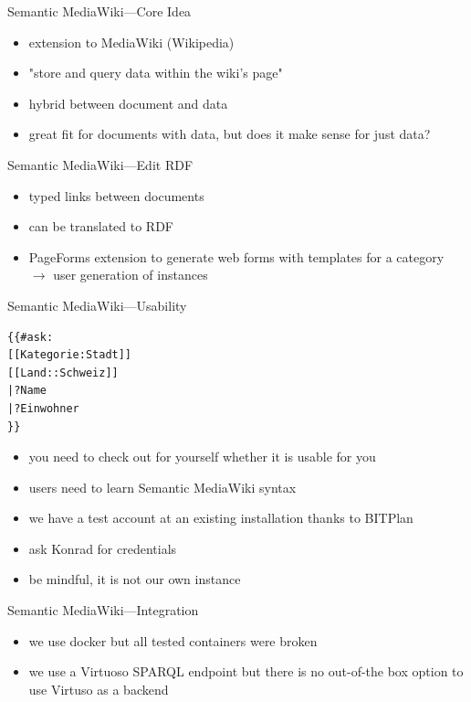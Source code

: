 \documentclass[aspectratio=1610]{beamer}
\begin{document}
\begin{frame}{Semantic MediaWiki---Core Idea}
\begin{itemize}
\item extension to MediaWiki (Wikipedia)
\item "store and query data within the wiki's page" 
\item hybrid between document and data
\item great fit for documents with data, but does it make sense for just data?
\end{itemize}
\end{frame}

\begin{frame}{Semantic MediaWiki---Edit RDF}
\begin{itemize}
\item typed links between documents
\item can be translated to RDF
\item PageForms extension to generate web forms with templates for a category $\rightarrow$ user generation of instances
\end{itemize}
\end{frame}

\begin{frame}[fragile]{Semantic MediaWiki---Usability}
\begin{verbatim}
{{#ask:
[[Kategorie:Stadt]]
[[Land::Schweiz]]
|?Name
|?Einwohner
}}
\end{verbatim}
\begin{itemize}
\item you need to check out for yourself whether it is usable for you
\item users need to learn Semantic MediaWiki syntax
\item we have a test account at an existing installation thanks to BITPlan
\item ask Konrad for credentials
\item be mindful, it is not our own instance
\end{itemize}
\end{frame}

\begin{frame}{Semantic MediaWiki---Integration}
\begin{itemize}
\item we use docker but all tested containers were broken
\item we use a Virtuoso SPARQL endpoint but there is no out-of-the box option to use Virtuso as a backend
\end{itemize}
\end{frame}
\end{document}
